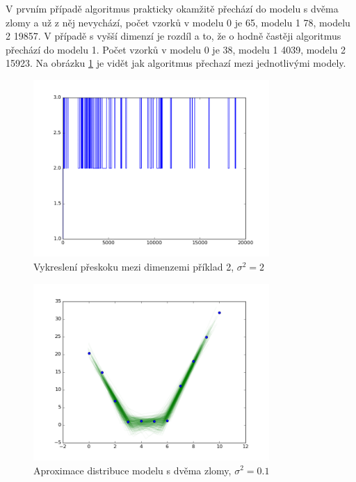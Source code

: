\documentclass[czech,master,public,dept470,male,cpdeclaration,oneside, python]{diploma}
\begin{document}
V prvním případě algoritmus prakticky okamžitě přechází do modelu s dvěma zlomy a už z něj nevychází, počet vzorků v modelu 0 je 65, modelu 1 78, modelu 2 19857. V případě s vyšší dimenzí je rozdíl a to, že o hodně častěji algoritmus přechází do modelu 1. Počet vzorků v modelu 0 je 38, modelu 1 4039, modelu 2 15923. Na obrázku \ref{priklad2_prechody} je vidět jak algoritmus přechazí mezi jednotlivými modely.
\begin{figure}
	[H]\centering\includegraphics[width=0.8\textwidth]{images/ks_examle_u_bigger_variance.png}\caption{Vykreslení přeskoku mezi dimenzemi příklad 2, $\sigma^2 = 2$}\label{priklad2_prechody}
\end{figure}
\begin{figure}
	[H]\centering\includegraphics[width=0.8\textwidth]{images/distribution_lines_u_2breaks_small_variance.png}\caption{Aproximace distribuce modelu s dvěma zlomy, $\sigma^2 = 0.1$}\label{priklad2_distribuce_small_sigma}
\end{figure}
\end{document}
